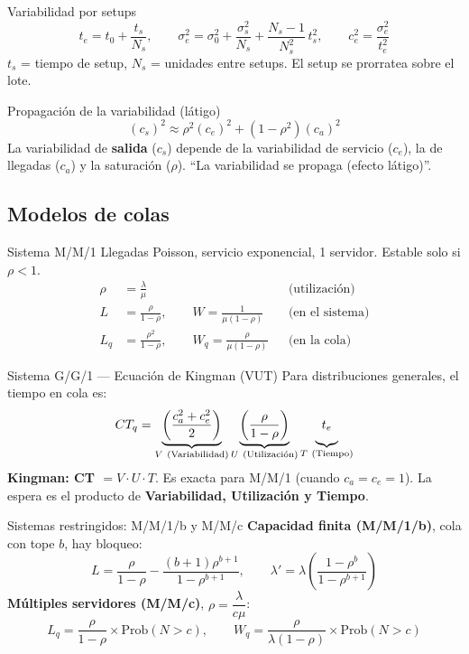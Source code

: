 \begin{formulas}{Variabilidad por setups}
\[
  t_e = t_0 + \frac{t_s}{N_s}, \qquad
  \sigma_e^2 = \sigma_0^2 + \frac{\sigma_s^2}{N_s} + \frac{N_s - 1}{N_s^2}\,t_s^2, \qquad
  c_e^2 = \frac{\sigma_e^2}{t_e^2}
\]
$t_s$ = tiempo de setup, $N_s$ = unidades entre setups. El setup se prorratea sobre el lote.
\end{formulas}

\begin{formulas}{Propagación de la variabilidad (látigo)}
\[
  (c_s)^2 \approx \rho^2 (c_e)^2 + (1 - \rho^2)(c_a)^2
\]
La variabilidad de \textbf{salida} ($c_s$) depende de la variabilidad de servicio ($c_e$), la de llegadas ($c_a$) y la saturación ($\rho$). ``La variabilidad se propaga (efecto látigo)''.
\end{formulas}

\subsection{Modelos de colas}

\begin{formulas}{Sistema M/M/1}
Llegadas Poisson, servicio exponencial, 1 servidor. Estable solo si $\rho<1$.
\begin{align*}
  \rho &= \frac{\lambda}{\mu} && \text{(utilización)}\\
  L &= \frac{\rho}{1-\rho}, \qquad W = \frac{1}{\mu(1-\rho)} && \text{(en el sistema)}\\
  L_q &= \frac{\rho^2}{1-\rho}, \qquad W_q = \frac{\rho}{\mu(1-\rho)} && \text{(en la cola)}
\end{align*}
\end{formulas}

\begin{formulas}{Sistema G/G/1 --- Ecuación de Kingman (VUT)}
Para distribuciones generales, el tiempo en cola es:
\[
  CT_q = \underbrace{\left(\frac{c_a^2 + c_e^2}{2}\right)}_{V\ (\text{Variabilidad})}
         \underbrace{\left(\frac{\rho}{1-\rho}\right)}_{U\ (\text{Utilización})}
         \underbrace{\vphantom{\frac{\rho}{1-\rho}}\ t_e\ }_{T\ (\text{Tiempo})}
\]
\textbf{Kingman: CT $= V\cdot U\cdot T$}. Es exacta para M/M/1 (cuando $c_a=c_e=1$). La espera es el producto de \textbf{Variabilidad, Utilización y Tiempo}.
\end{formulas}

\begin{formulas}{Sistemas restringidos: M/M/1/b y M/M/c}
\textbf{Capacidad finita (M/M/1/b)}, cola con tope $b$, hay bloqueo:
\[
  L = \frac{\rho}{1-\rho} - \frac{(b+1)\rho^{b+1}}{1-\rho^{b+1}}, \qquad
  \lambda' = \lambda\left(\frac{1-\rho^b}{1-\rho^{b+1}}\right)
\]
\textbf{Múltiples servidores (M/M/c)}, $\rho = \dfrac{\lambda}{c\mu}$:
\[
  L_q = \frac{\rho}{1-\rho}\times \text{Prob}(N>c), \qquad
  W_q = \frac{\rho}{\lambda(1-\rho)}\times \text{Prob}(N>c)
\]
\end{formulas}


